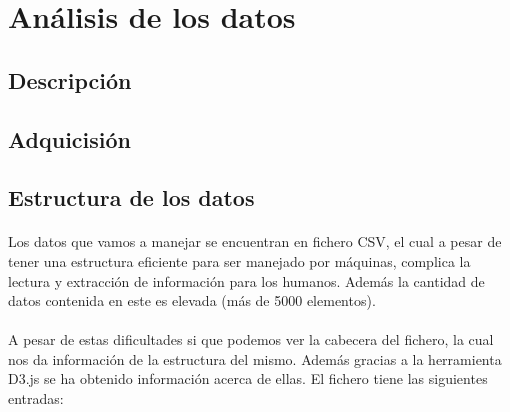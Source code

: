 \documentclass{article}
\begin{document}
	\section{Análisis de los datos}


		\subsection{Descripción}


		\subsection{Adquicisión}


		\subsection{Estructura de los datos}
			
			\paragraph{}
			Los datos que vamos a manejar se encuentran en fichero CSV, el cual a pesar de tener una estructura eficiente para ser manejado por máquinas, complica la lectura y extracción de información para los humanos. Además la cantidad de datos contenida en este es elevada (más de 5000 elementos).
			
			\paragraph{}
			A pesar de estas dificultades si que podemos ver la cabecera del fichero, la cual nos da información de la estructura del mismo. Además gracias a la herramienta D3.js se ha obtenido información acerca de ellas. El fichero tiene las siguientes entradas:
	
\end{document}
